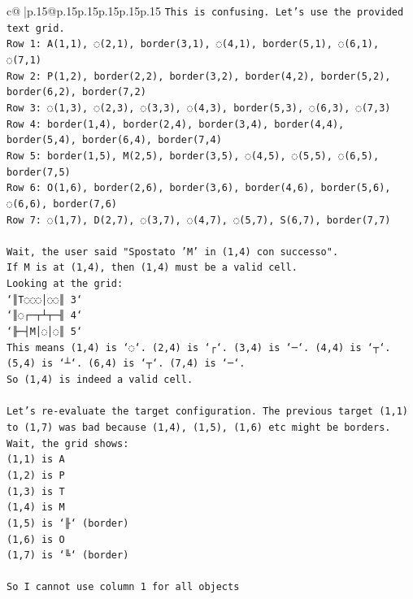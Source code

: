 \documentclass{article}
\begin{document}
{\begin{supertabular}{c@{$\;$}|p{.15\linewidth}@{}p{.15\linewidth}p{.15\linewidth}p{.15\linewidth}p{.15\linewidth}p{.15\linewidth}}
{{{\texttt{This is confusing. Let's use the provided text grid.} \\
\texttt{Row 1: A(1,1), ◌(2,1), border(3,1), ◌(4,1), border(5,1), ◌(6,1), ◌(7,1)} \\
\texttt{Row 2: P(1,2), border(2,2), border(3,2), border(4,2), border(5,2), border(6,2), border(7,2)} \\
\texttt{Row 3: ◌(1,3), ◌(2,3), ◌(3,3), ◌(4,3), border(5,3), ◌(6,3), ◌(7,3)} \\
\texttt{Row 4: border(1,4), border(2,4), border(3,4), border(4,4), border(5,4), border(6,4), border(7,4)} \\
\texttt{Row 5: border(1,5), M(2,5), border(3,5), ◌(4,5), ◌(5,5), ◌(6,5), border(7,5)} \\
\texttt{Row 6: O(1,6), border(2,6), border(3,6), border(4,6), border(5,6), ◌(6,6), border(7,6)} \\
\texttt{Row 7: ◌(1,7), D(2,7), ◌(3,7), ◌(4,7), ◌(5,7), S(6,7), border(7,7)} \\
\\ 
\texttt{Wait, the user said "Spostato 'M' in (1,4) con successo".} \\
\texttt{If M is at (1,4), then (1,4) must be a valid cell.} \\
\texttt{Looking at the grid:} \\
\texttt{`║T◌◌◌│◌◌║ 3`} \\
\texttt{`║◌┌─┬┴┬─╢ 4`} \\
\texttt{`╟─┤M│◌│◌║ 5`} \\
\texttt{This means (1,4) is `◌`. (2,4) is `┌`. (3,4) is `─`. (4,4) is `┬`. (5,4) is `┴`. (6,4) is `┬`. (7,4) is `─`.} \\
\texttt{So (1,4) is indeed a valid cell.} \\
\\ 
\texttt{Let's re{-}evaluate the target configuration. The previous target (1,1) to (1,7) was bad because (1,4), (1,5), (1,6) etc might be borders.} \\
\texttt{Wait, the grid shows:} \\
\texttt{(1,1) is A} \\
\texttt{(1,2) is P} \\
\texttt{(1,3) is T} \\
\texttt{(1,4) is M} \\
\texttt{(1,5) is `╟` (border)} \\
\texttt{(1,6) is O} \\
\texttt{(1,7) is `╚` (border)} \\
\\ 
\texttt{So I cannot use column 1 for all objects} \\
            }
        }
    }
     \\ \\


\end{supertabular}}
\end{document}
